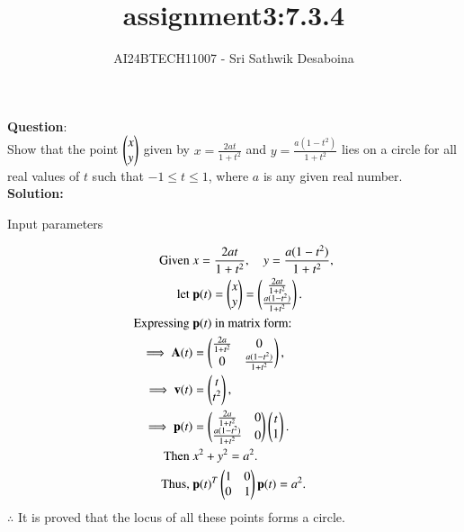 \documentclass[journal,12pt,onecolumn]{IEEEtran}
\theoremstyle{remark}
\begin{document}

\vspace{3cm}

\title{assignment3:7.3.4}
\author{AI24BTECH11007 - Sri Sathwik Desaboina}
\maketitle
\bigskip

\renewcommand{\thefigure}{\theenumi}
\renewcommand{\thetable}{\theenumi}
\textbf{Question}:\\
Show that the point $\begin{pmatrix}x \\ y\end{pmatrix}$ given by $x = \frac{2at}{1 + t^2}$ and $y = \frac{a(1 - t^2)}{1 + t^2}$ lies on a circle for all real values of $t$ such that $-1 \leq t \leq 1$, where $a$ is any given real number.
\\
\textbf{Solution: }
\begin{table}[h!]    
    \centering
    
    \caption{Input parameters }
    \label{table}
  \end{table}

 \begin{align*}
\text{Given } & x = \frac{2at}{1 + t^2}, \quad y = \frac{a(1 - t^2)}{1 + t^2}, \\
\text{let } & \mathbf{p}(t) = \begin{pmatrix}x \\ y\end{pmatrix} = \begin{pmatrix}\frac{2at}{1 + t^2} \\ \frac{a(1 - t^2)}{1 + t^2}\end{pmatrix}. \\
\text{Expressing } & \mathbf{p}(t) \text{ in matrix form:} \\
 \implies \mathbf{A}(t) & = \begin{pmatrix} \frac{2a}{1+t^2} & 0 \\ 0 & \frac{a(1-t^2)}{1+t^2} \end{pmatrix}, \\
	 \implies \mathbf{v}(t) & = \begin{pmatrix}t \\ t^2\end{pmatrix}, \\
 \implies \mathbf{p}(t) & = \begin{pmatrix} \frac{2a}{1+t^2} & 0 \\ \frac{a(1 - t^2)}{1+t^2} & 0 \end{pmatrix} \begin{pmatrix}t \\ 1\end{pmatrix}. \\
\text{Then } & x^2 + y^2 = a^2. \\
\text{Thus, } & \mathbf{p}(t)^T \begin{pmatrix} 1 & 0 \\ 0 & 1 \end{pmatrix} \mathbf{p}(t) = a^2.
\end{align*}
$\therefore$ It is proved that the locus of all these points forms a circle.
\end{document}
